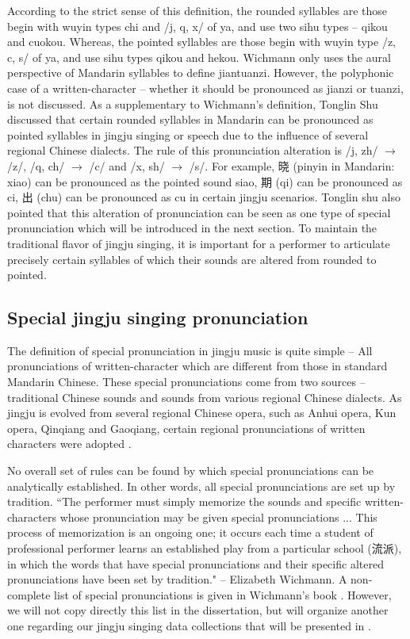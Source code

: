 According to the strict sense of this definition, the rounded syllables are those begin with wuyin types chi and /j, q, x/ of ya, and use two sihu types -- qikou and cuokou. Whereas, the pointed syllables are those begin with wuyin type /z, c, s/ of ya, and use sihu types qikou and hekou. Wichmann only uses the aural perspective of Mandarin syllables to define \gls{jiantuanzi}. However, the polyphonic case of a written-character -- whether it should be pronounced as \gls{jianzi} or \gls{tuanzi}, is not discussed. As a supplementary to Wichmann's definition, Tonglin Shu \cite{TonglinShu2011a} discussed that certain rounded syllables in Mandarin can be pronounced as pointed syllables in jingju singing or speech due to the influence of several regional Chinese dialects. The rule of this pronunciation alteration is /j, zh/ $\rightarrow$ /z/, /q, ch/ $\rightarrow$ /c/ and /x, sh/ $\rightarrow$ /s/. For example, 晓 (pinyin in Mandarin: xiao) can be pronounced as the pointed sound siao, 期 (qi) can be pronounced as ci, 出 (chu) can be pronounced as cu in certain jingju scenarios. Tonglin shu also pointed that this alteration of pronunciation can be seen as one type of special pronunciation which will be introduced in the next section. To maintain the traditional flavor of jingju singing, it is important for a performer to articulate precisely certain syllables of which their sounds are altered from rounded to pointed.

\subsection{Special jingju singing pronunciation}\label{sec:ch2:special_pronunciation}

The definition of special pronunciation in jingju music is quite simple -- All pronunciations of written-character which are different from those in standard Mandarin Chinese. These special pronunciations come from two sources -- traditional Chinese sounds and sounds from various regional Chinese dialects. As jingju is evolved from several regional Chinese opera, such as Anhui opera, Kun opera, Qinqiang and Gaoqiang, certain regional pronunciations of written characters were adopted \cite{Wichmann1991a}.

No overall set of rules can be found by which special pronunciations can be analytically established. In other words, all special pronunciations are set up by tradition. ``The performer must simply memorize the sounds and specific written-characters whose pronunciation may be given special pronunciations ... This process of memorization is an ongoing one; it occurs each time a student of professional performer learns an established play from a particular school (流派), in which the words that have special pronunciations and their specific altered pronunciations have been set by tradition." -- Elizabeth Wichmann. A non-complete list of special pronunciations is given in Wichmann's book \cite{Wichmann1991a}. However, we will not copy directly this list in the dissertation, but will organize another one regarding our jingju singing data collections that will be presented in .

